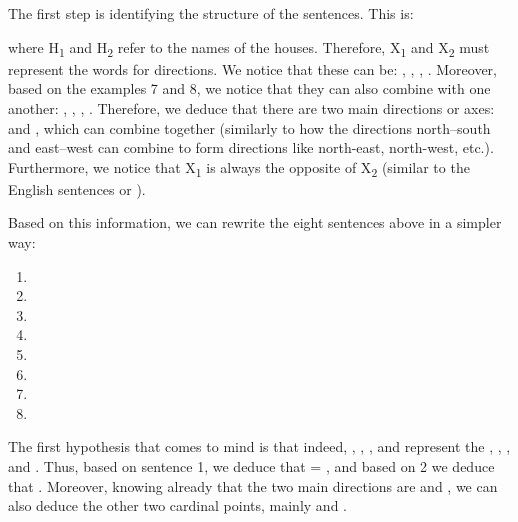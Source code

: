 \begin{refsection}
\begin{mysolution}

The first step is identifying the structure of the sentences. This is:

 \noindent where H\textsubscript{1} and H\textsubscript{2} refer to the names of the houses. Therefore, X\textsubscript{1} and X\textsubscript{2} must represent the words for directions. We notice that these can be: , , , . Moreover, based on the examples 7 and 8, we notice that they can also combine with one another: , , , . Therefore, we deduce that there are two main directions or axes:  and , which can combine together (similarly to how the directions north--south and east--west can combine to form directions like north-east, north-west, etc.). Furthermore, we notice that X\textsubscript{1} is always the opposite of X\textsubscript{2} (similar to the English sentences  or ).

 Based on this information, we can rewrite the eight sentences above in a simpler way:
     \begin{enumerate}[leftmargin = 5 em]

         \item {}  
         \item {}  
         \item {}  
         \item {}  
         \item {}  
         \item {}  
         \item {}  
         \item {}  
     \end{enumerate}

The first hypothesis that comes to mind is that indeed, , , , and  represent the , , , and . Thus, based on sentence 1, we deduce that  = , and based on 2 we deduce that . Moreover, knowing already that the two main directions are  and , we can also deduce the other two cardinal points, mainly  and .


\end{mysolution}
\end{refsection}
